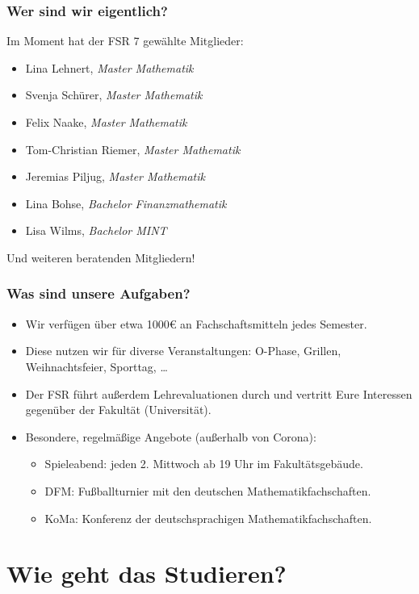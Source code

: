 \documentclass[10pt]{beamer}
\begin{document}
\begin{frame}
	\frametitle{Wer sind wir eigentlich?}

	Im Moment hat der FSR 7 gewählte Mitglieder:

	\begin{itemize}
		\item Lina Lehnert, \textit{Master Mathematik}
		\item Svenja Schürer, \textit{Master Mathematik}
		\item Felix Naake, \textit{Master Mathematik}
		\item Tom-Christian Riemer, \textit{Master Mathematik}
		\item Jeremias Piljug, \textit{Master Mathematik}
		\item Lina Bohse, \textit{Bachelor Finanzmathematik}
		\item Lisa Wilms, \textit{Bachelor MINT}
	\end{itemize}

	Und weiteren beratenden Mitgliedern!
\end{frame}

\begin{frame}
	\frametitle{Was sind unsere Aufgaben?}

	\begin{itemize}
		\item Wir verfügen über etwa 1000\euro{} an Fachschaftsmitteln jedes Semester.
		\item Diese nutzen wir für diverse Veranstaltungen: O-Phase, Grillen, Weihnachtsfeier, Sporttag, \ldots
		\item Der FSR führt außerdem Lehrevaluationen durch und vertritt Eure Interessen gegenüber der Fakultät (Universität).
		\item Besondere, regelmäßige Angebote (außerhalb von Corona):
			\begin{itemize}
				\item Spieleabend: jeden 2. Mittwoch ab 19 Uhr im Fakultätsgebäude.
				\item DFM: Fußballturnier mit den deutschen Mathematikfachschaften.
				\item KoMa: Konferenz der deutschsprachigen Mathematikfachschaften.
			\end{itemize}
	\end{itemize}
\end{frame}


\section{Wie geht das Studieren?}
\frame{\tableofcontents[currentsection]}
\end{document}
